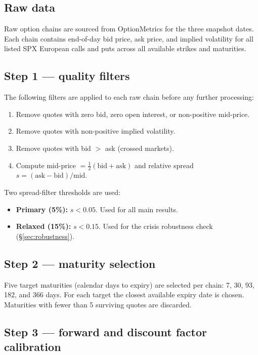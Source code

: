 \documentclass[11pt,a4paper]{article}
\begin{document}
\subsection{Raw data}

Raw option chains are sourced from OptionMetrics for the three snapshot dates.
Each chain contains end-of-day bid price, ask price, and implied volatility
for all listed SPX European calls and puts across all available strikes and
maturities.

\subsection{Step 1 — quality filters}

The following filters are applied to each raw chain before any further
processing:
\begin{enumerate}[leftmargin=*, label=(\roman*)]
  \item Remove quotes with zero bid, zero open interest, or non-positive
        mid-price.
  \item Remove quotes with non-positive implied volatility.
  \item Remove quotes with bid $>$ ask (crossed markets).
  \item Compute mid-price $= \tfrac{1}{2}(\text{bid} + \text{ask})$ and
        relative spread $s = (\text{ask} - \text{bid}) / \text{mid}$.
\end{enumerate}

Two spread-filter thresholds are used:
\begin{itemize}[noitemsep]
  \item \textbf{Primary (5\%):} $s < 0.05$.  Used for all main results.
  \item \textbf{Relaxed (15\%):} $s < 0.15$.  Used for the crisis robustness
        check (\S\ref{sec:robustness}).
\end{itemize}

\subsection{Step 2 — maturity selection}

Five target maturities (calendar days to expiry) are selected per chain:
7, 30, 93, 182, and 366 days.  For each target the closest available
expiry date is chosen.  Maturities with fewer than 5 surviving quotes are
discarded.

\subsection{Step 3 — forward and discount factor calibration}
\end{document}
